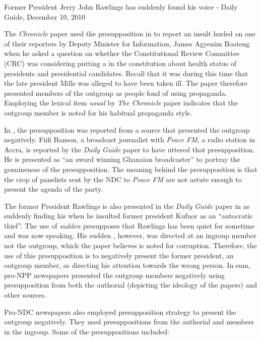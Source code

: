 \documentclass[output=paper,modfonts]{langscibook}
\begin{document}
\ea \label{ex:ofori:11}
\textup{Former President Jerry John Rawlings has suddenly found his voice} - Daily Guide, December 10, 2010\z

The \textit{Chronicle} paper used the presupposition in  to report an insult hurled on one of their reporters by Deputy Minister for Information, James Agyenim Boateng when he asked a question on whether the Constitutional Review Committee (CRC) was considering putting a  in the constitution about health status of presidents and presidential candidates. Recall that it was during this time that the late president Mills was alleged to have been taken ill. The paper therefore presented members of the outgroup as people fond of using propaganda. Employing the lexical item \textit{usual} by \textit{The Chronicle} paper indicates that the outgroup member is noted for his habitual propaganda style. 

In , the presupposition was reported from a source that presented the outgroup negatively. Fiifi Banson, a broadcast journalist with \textit{Peace FM}, a radio station in Accra, is reported by the \textit{Daily Guide} paper to have uttered that presupposition. He is presented as ``an award winning Ghanaian broadcaster'' to portray the genuineness of the presupposition. The meaning behind the presupposition is that the crop of panelists sent by the NDC to \textit{Peace FM} are not astute enough to present the agenda of the party. 

The former President Rawlings is also presented in the \textit{Daily Guide} paper in  as suddenly finding his  when he insulted former president Kufuor as an “autocratic thief”. The use of \textit{sudden} presupposes that Rawlings has been quiet for sometime and was now speaking. His sudden , however, was directed at an ingroup member not the outgroup, which the paper believes is noted for corruption. Therefore, the use of this presupposition is to negatively present the former president, an outgroup member, as directing his attention towards the wrong person. In sum, pro-NPP newspapers presented the outgroup members negatively using presupposition from both the authorial  (depicting the ideology of the papers) and other sources.

Pro-NDC newspapers also employed presupposition strategy to present the outgroup negatively. They used presuppositions from the authorial  and members in the ingroup. Some of the presuppositions included:
\end{document}
